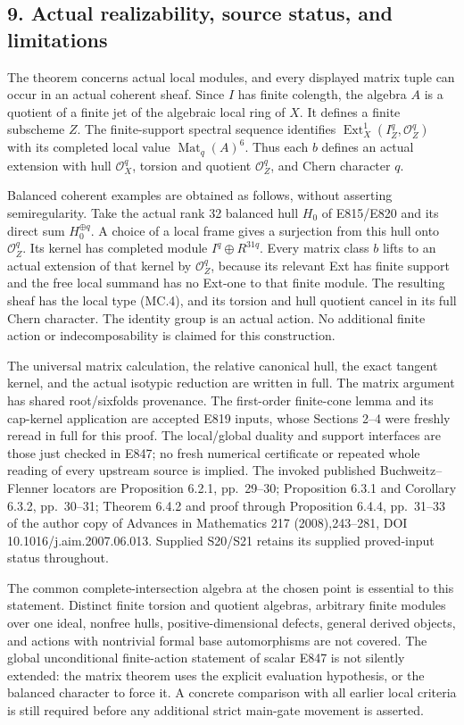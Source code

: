 \subsection{9. Actual realizability, source status, and limitations}\label{SF-E848:s9}

The theorem concerns actual local modules, and every displayed matrix
tuple can occur in an actual coherent sheaf. Since \(I\) has finite
colength, the algebra \(A\) is a quotient of a finite jet of the
algebraic local ring of \(X\). It defines a finite subscheme \(Z\).
The finite-support spectral sequence identifies
\(\operatorname{Ext}^1_X(I_Z^q,\mathcal O_Z^q)\) with its completed
local value \(\operatorname{Mat}_q(A)^6\). Thus each \(b\) defines
an actual extension with hull \(\mathcal O_X^q\), torsion and
quotient \(\mathcal O_Z^q\), and Chern character \(q\).

Balanced coherent examples are obtained as follows, without asserting
semiregularity. Take the actual rank 32 balanced hull \(H_0\) of
E815/E820 and its direct sum \(H_0^{\oplus q}\). A choice of a local
frame gives a surjection from this hull onto \(\mathcal O_Z^q\).
Its kernel has completed module \(I^q\oplus R^{31q}\). Every matrix
class \(b\) lifts to an actual extension of that kernel by
\(\mathcal O_Z^q\), because its relevant Ext has finite support and
the free local summand has no Ext-one to that finite module. The
resulting sheaf has the local type (MC.4), and its torsion and hull
quotient cancel in its full Chern character. The identity group is
an actual action. No additional finite action or indecomposability is
claimed for this construction.

The universal matrix calculation, the relative canonical hull, the
exact tangent kernel, and the actual isotypic reduction are written in
full. The matrix argument has shared root/sixfolds provenance. The
first-order finite-cone lemma and its cap-kernel application are
accepted E819 inputs, whose Sections 2--4 were freshly reread in full
for this proof. The local/global duality and support interfaces are
those just checked in E847; no fresh numerical certificate or repeated
whole reading of every upstream source is implied. The invoked
published Buchweitz--Flenner locators are Proposition 6.2.1,
pp.~29--30; Proposition 6.3.1 and Corollary 6.3.2, pp.~30--31;
Theorem 6.4.2 and proof through Proposition 6.4.4, pp.~31--33 of the
author copy of Advances in Mathematics 217 (2008),243--281,
DOI 10.1016/j.aim.2007.06.013. Supplied S20/S21 retains its supplied
proved-input status throughout.

The common complete-intersection algebra at the chosen point is
essential to this statement. Distinct finite torsion and quotient
algebras, arbitrary finite modules over one ideal, nonfree hulls,
positive-dimensional defects, general derived objects, and actions
with nontrivial formal base automorphisms are not covered. The global
unconditional finite-action statement of scalar E847 is not silently
extended: the matrix theorem uses the explicit evaluation hypothesis,
or the balanced character to force it. A concrete comparison with all
earlier local criteria is still required before any additional strict
main-gate movement is asserted.

